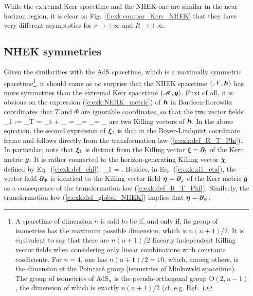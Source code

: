 \begin{remark}
While the extremal Kerr spacetime and the NHEK one are similar in the
near-horizon region, it is clear on Fig.~\ref{f:exk:compar_Kerr_NHEK} that they
have very different asymptotics for $r\to \pm \infty$ and $R\to \pm \infty$.
\end{remark}

\subsection{NHEK symmetries}

Given the similarities with the AdS spacetime, which is a maximally symmetric spacetime\footnote{A spacetime of dimension $n$
is said to be  if, and only if,
its group of isometries has the maximum possible dimension, which is $n(n+1)/2$.
It is equivalent to say that there are $n(n+1)/2$ linearly independent Killing vector fields
when considering only linear combinations with constants coefficients.
For $n=4$, one has $n(n+1)/2=10$, which, among others,
is the dimension of the Poincaré group (isometries of Minkowski spacetime).
The group of isometries of AdS$_n$ is the pseudo-orthogonal group $\mathrm{O}(2, n-1)$,
the dimension of which is exactly $n(n+1)/2$ (cf. e.g. Ref.~\cite{ONeil83}).},
it should come as no surprise that the NHEK spacetime $(\mathscr{N},\bm{h})$
has more symmetries than the extremal Kerr spacetime $(\mathscr{M},\bm{g})$. First of all, it is
obvious on the expression (\ref{e:exk:NEHK_metric}) of $\bm{h}$
in Bardeen-Horowitz coordinates that $T$ and $\Phi$ are ignorable coordinates,
so that the two vector fields
\be \label{e:exk:xi1_eta}
   \w{\xi}_1 := \wpar_T =    \wpar_t +  \wpar_\ph
   \qand
   \w{\eta} = \wpar_\Phi = \wpar_\ph = \wpar_\psi
\ee
are two Killing vectors of $\bm{h}$. In the above equation, the second expression of $\bm{\xi}_1$
is that in the Boyer-Lindquist coordinate frame and
follows directly from the transformation law (\ref{e:exk:def_R_T_Phi}).
In particular, note that $\bm{\xi}_1$ is distinct from the Killing vector
$\bm{\xi} = \bm{\partial}_t$ of the Kerr metric $\bm{g}$. It is rather connected
to the horizon-generating Killing vector $\bm{\chi}$ defined by
Eq.~(\ref{e:exk:def_chi}):
\be
    \w{\xi}_1 =  \w{\chi} .
\ee
Besides, in Eq.~(\ref{e:exk:xi1_eta}),
the vector field $\bm{\partial}_\Phi$ is identical
to the Killing vector field $\bm{\eta} = \bm{\partial}_\varphi$ of the Kerr metric $\bm{g}$
as a consequence of the transformation law (\ref{e:exk:def_R_T_Phi}). Similarly,
the transformation law (\ref{e:exk:def_global_NHEK}) implies that
$\bm{\eta} = \bm{\partial}_\psi$.

